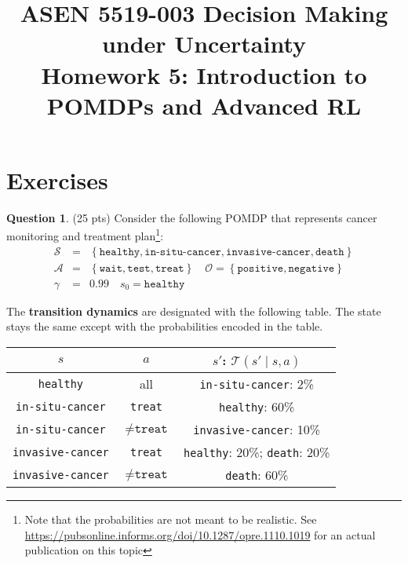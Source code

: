\documentclass{article}
\title{ASEN 5519-003 Decision Making under Uncertainty\\
       Homework 5: Introduction to POMDPs and Advanced RL}
\theoremstyle{definition}
\newtheorem{question}[thm]{Question}
\newcommand{\ttt}[1]{\texttt{#1}}
\begin{document}
\maketitle

\section{Exercises}

\begin{question}
    (25 pts) Consider the following POMDP that represents cancer monitoring and treatment plan\footnote{Note that the probabilities are not meant to be realistic. See \url{https://pubsonline.informs.org/doi/10.1287/opre.1110.1019} for an actual publication on this topic}:
\begin{eqnarray*}
    \mathcal{S} &=& \left\{\texttt{healthy}, \texttt{in-situ-cancer}, \texttt{invasive-cancer}, \texttt{death}\right\}\\
    \mathcal{A} &=& \left\{\texttt{wait}, \texttt{test}, \texttt{treat}\right\} \quad \mathcal{O} = \left\{\texttt{positive}, \texttt{negative}\right\}\\
    \gamma &=& 0.99 \quad
    s_0 = \texttt{healthy}
\end{eqnarray*}

The \textbf{transition dynamics} are designated with the following table. The state stays the same except with the probabilities encoded in the table.
\begin{center}
\begin{tabular}{ccc}
    \toprule
    $s$ & $a$ & $s'$: $\mathcal{T}(s' \mid s, a)$ \\
    \midrule
    \ttt{healthy} & all & \ttt{in-situ-cancer}: 2\% \\
    \ttt{in-situ-cancer} & \ttt{treat} & \ttt{healthy}: 60\% \\
    \ttt{in-situ-cancer} & $\neq\ttt{treat}$ & \ttt{invasive-cancer}: 10\% \\
    \ttt{invasive-cancer} & \ttt{treat} & \ttt{healthy}: 20\%; \ttt{death}: 20\% \\
    \ttt{invasive-cancer} & $\neq\ttt{treat}$ & \ttt{death}: 60\% \\
    \bottomrule
\end{tabular}
\end{center}


\end{question}
\end{document}
